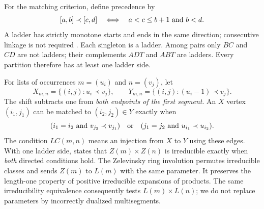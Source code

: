 \documentclass[11pt]{article}
\begin{document}
For the matching criterion, define precedence by
\[
[a,b]\prec[c,d]\quad\Longleftrightarrow\quad a<c\le b+1\ \hbox{and}\ b<d.
\]
A ladder has strictly monotone starts and ends in the same direction; consecutive linkage is not required \cite[Definition 5.13]{LM16}. Each singleton is a ladder. Among pairs only $BC$ and $CD$ are not ladders; their complements $ADT$ and $ABT$ are ladders. Every partition therefore has at least one ladder side.

For lists of occurrences $m=(u_i)$ and $n=(v_j)$, let
\[
X_{m,n}=\{(i,j):u_i\prec v_j\},\qquad
Y_{m,n}=\{(i,j):(u_i-1)\prec v_j\}.
\]
The shift subtracts one from \emph{both endpoints of the first segment}. An $X$ vertex $(i_1,j_1)$ can be matched to $(i_2,j_2)\in Y$ exactly when
\[
(i_1=i_2\ \hbox{and}\ v_{j_2}\prec v_{j_1})
\quad\hbox{or}\quad
(j_1=j_2\ \hbox{and}\ u_{i_1}\prec u_{i_2}).
\]
The condition $LC(m,n)$ means an injection from $X$ to $Y$ using these edges. With one ladder side, \cite[\S5.3, Proposition 5.20]{LM16} states that $Z(m)\times Z(n)$ is irreducible exactly when \emph{both} directed conditions hold. The Zelevinsky ring involution \cite[\S A.5]{LM16} permutes irreducible classes and sends $Z(m)$ to $L(m)$ with the same parameter. It preserves the length-one property of positive irreducible expansions of products. The same irreducibility equivalence consequently tests $L(m)\times L(n)$; we do not replace parameters by incorrectly dualized multisegments.
\end{document}
